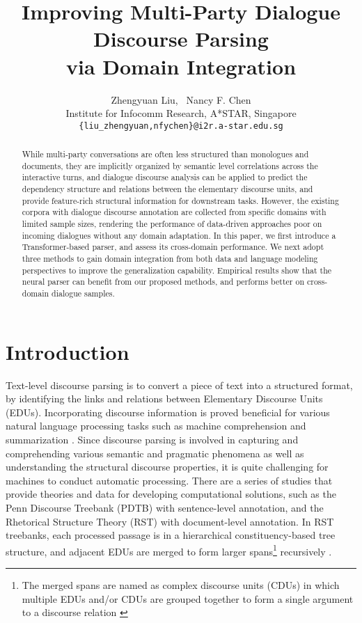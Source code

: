 \documentclass[11pt]{article}
\title{Improving Multi-Party Dialogue Discourse Parsing \\via Domain Integration}
\author{Zhengyuan Liu, \ Nancy F. Chen \\
  Institute for Infocomm Research, A*STAR, Singapore \\
  \texttt{\{liu\_zhengyuan,nfychen\}@i2r.a-star.edu.sg}}
\date{}
\begin{document}
\maketitle
\begin{abstract}
While multi-party conversations are often less structured than monologues and documents, they are implicitly organized by semantic level correlations across the interactive turns, and dialogue discourse analysis can be applied to predict the dependency structure and relations between the elementary discourse units, and provide feature-rich structural information for downstream tasks. However, the existing corpora with dialogue discourse annotation are collected from specific domains with limited sample sizes, rendering the performance of data-driven approaches poor on incoming dialogues without any domain adaptation. 
In this paper, we first introduce a Transformer-based parser, and assess its cross-domain performance. We next adopt three methods to gain domain integration from both data and language modeling perspectives to improve the generalization capability. Empirical results show that the neural parser can benefit from our proposed methods, and performs better on cross-domain dialogue samples.
\end{abstract}

\section{Introduction}
\label{introduction}
Text-level discourse parsing is to convert a piece of text into a structured format, by identifying the links and relations between Elementary Discourse Units (EDUs). Incorporating discourse information is proved beneficial for various natural language processing tasks such as machine comprehension \cite{narasimhan-barzilay-2015-machine} and summarization \cite{xu-etal-2020-discoBERT}. Since discourse parsing is involved in capturing and comprehending various semantic and pragmatic phenomena as well as understanding the structural discourse properties, it is quite challenging for machines to conduct automatic processing. There are a series of studies that provide theories and data for developing computational solutions, such as the Penn Discourse Treebank (PDTB) \cite{prasad2008pennPDTB} with sentence-level annotation, and the Rhetorical Structure Theory (RST) \cite{carlson2002rst} with document-level annotation. In RST treebanks, each processed passage is in a hierarchical constituency-based tree structure, and adjacent EDUs are merged to form larger spans\footnote{The merged spans are named as complex discourse units (CDUs) in which multiple EDUs and/or CDUs are grouped together to form a single argument to a discourse relation \cite{asher2016STAC}} recursively \cite{li2014recursive}.
\end{document}
